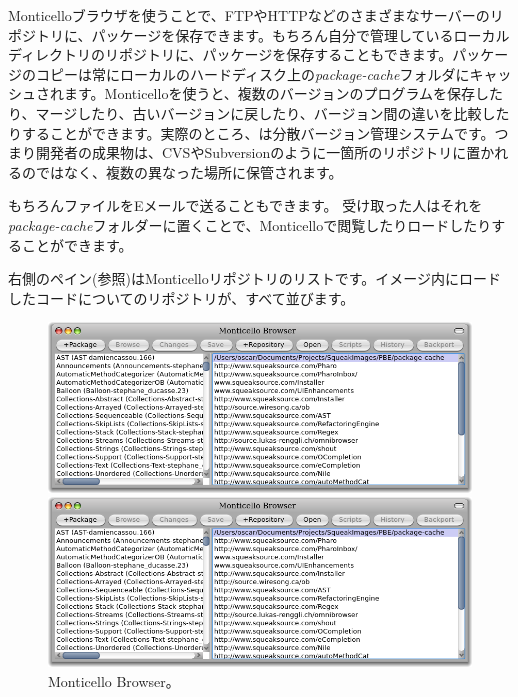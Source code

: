 \documentclass[a4paper,10pt,twoside]{book}
\begin{document}
Monticelloブラウザを使うことで、FTPやHTTPなどのさまざまなサーバーのリポジトリに、パッケージを保存できます。もちろん自分で管理しているローカルディレクトリのリポジトリに、パッケージを保存することもできます。パッケージのコピーは常にローカルのハードディスク上の\emph{package-cache}フォルダにキャッシュされます。Monticelloを使うと、複数のバージョンのプログラムを保存したり、マージしたり、古いバージョンに戻したり、バージョン間の違いを比較したりすることができます。実際のところ、は分散バージョン管理システムです。つまり開発者の成果物は、CVSやSubversionのように一箇所のリポジトリに置かれるのではなく、複数の異なった場所に保管されます。

もちろんファイルをEメールで送ることもできます。
受け取った人はそれを\emph{package-cache}フォルダーに置くことで、Monticelloで閲覧したりロードしたりすることができます。

右側のペイン(参照)はMonticelloリポジトリのリストです。イメージ内にロードしたコードについてのリポジトリが、すべて並びます。


\begin{figure}[hbt]
\ifluluelse
	{\centerline {\includegraphics[width=\textwidth]{MonticelloBrowser}}}
	{\centerline {\includegraphics[scale=0.7]{MonticelloBrowser}}}
\caption{Monticello Browser。
}
\end{figure}
\end{document}
